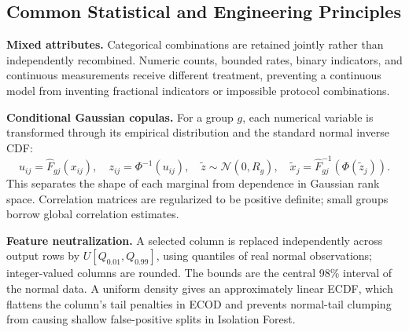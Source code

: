 \documentclass[10pt,a4paper]{article}
\begin{document}
\subsection{Common Statistical and Engineering Principles}
\textbf{Mixed attributes.} Categorical combinations are retained jointly rather than independently recombined. Numeric counts, bounded rates, binary indicators, and continuous measurements receive different treatment, preventing a continuous model from inventing fractional indicators or impossible protocol combinations.

\textbf{Conditional Gaussian copulas.} For a group $g$, each numerical variable is transformed through its empirical distribution and the standard normal inverse CDF:
\begin{equation}
u_{ij}=\widehat F_{gj}(x_{ij}),\quad z_{ij}=\Phi^{-1}(u_{ij}),\quad
\widetilde z\sim\mathcal N(0,R_g),\quad
\widetilde x_j=\widehat F_{gj}^{-1}\!\left(\Phi(\widetilde z_j)\right).
\end{equation}
This separates the shape of each marginal from dependence in Gaussian rank space. Correlation matrices are regularized to be positive definite; small groups borrow global correlation estimates.

\textbf{Feature neutralization.} A selected column is replaced independently across output rows by $U[Q_{0.01},Q_{0.99}]$, using quantiles of real normal observations; integer-valued columns are rounded. The bounds are the central 98\% interval of the normal data. A uniform density gives an approximately linear ECDF, which flattens the column's tail penalties in ECOD and prevents normal-tail clumping from causing shallow false-positive splits in Isolation Forest.
\end{document}
